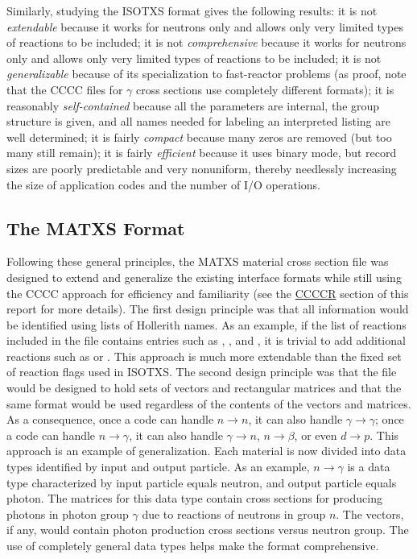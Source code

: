 Similarly, studying the ISOTXS format gives the following results:  it
is not {\it extendable} because it works for neutrons only and allows
only very limited types of reactions to be included; it is not {\it
comprehensive} because it works for neutrons only and allows only very
limited types of reactions to be included; it is not {\it
generalizable} because of its specialization to fast-reactor problems
(as proof, note that the CCCC files for $\gamma$ cross sections use
completely different formats); it is reasonably {\it self-contained}
because all the parameters are internal, the group structure is given,
and all names needed for labeling an interpreted listing are well
determined; it is fairly {\it compact} because many zeros are removed
(but too many still remain); it is fairly {\it efficient} because it
uses binary mode, but record sizes are poorly predictable and very
nonuniform, thereby needlessly increasing the size of application codes
and the number of I/O operations.

\subsection{The MATXS Format}
\label{ssMSTXSR_format}

Following these general principles, the MATXS material cross section
file was designed to extend and generalize the existing interface
formats while still using the CCCC approach for efficiency and
familiarity (see the \hyperlink{sCCCCRhy}{CCCCR} section of this
report for more details).  The
first design principle was that all information would be identified
using lists of Hollerith names.  As an example, if the list of reactions
included in the file contains entries such as , ,
and , it is trivial to add additional reactions such
as  or .  This approach is much more extendable
than the fixed set of reaction flags used in ISOTXS.  The second design
principle was that the file would be designed to hold sets of vectors
and rectangular matrices and that the same format would be used
regardless of the contents of the vectors and matrices.  As a
consequence, once a code can handle $n{\rightarrow}n$, it can also
handle $\gamma{\rightarrow}\gamma$; once a code can handle
$n{\rightarrow}\gamma$, it can also handle $\gamma{\rightarrow}n$,
$n{\rightarrow}\beta$, or even $d{\rightarrow}p$.  This approach
is an example of generalization.  Each material is now divided into
data types identified by input and output particle.  As an example,
$n{\rightarrow}\gamma$ is a data type characterized by input particle
equals neutron, and output particle equals photon.  The matrices for
this data type contain cross sections for producing photons in photon
group $\gamma$ due to reactions of neutrons in group $n$.  The
vectors, if any, would contain photon production cross sections
versus neutron group.  The use of completely general data types helps
make the format comprehensive.

